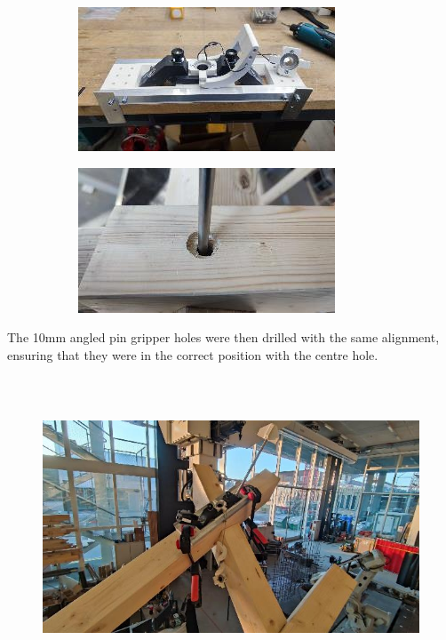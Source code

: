 \documentclass[11pt]{book}
\begin{document}
\begin{figure}[H]
\centering
\begin{subfigure}[b]{0.45\textwidth}
\centering
\includegraphics[width=\textwidth]{./images/image92.jpeg}
\end{subfigure}
\hfill
\begin{subfigure}[b]{0.45\textwidth}
\centering
\includegraphics[width=\textwidth]{./images/image93.jpeg}
\end{subfigure}
\end{figure}


The 10mm angled pin gripper holes were then drilled with the same alignment, ensuring that they were in the correct position with the centre hole. 

\begin{figure}[H]
\includegraphics[width=15.92cm,height=8.96cm]{./images/image94.jpeg}
\end{figure}
\end{document}
